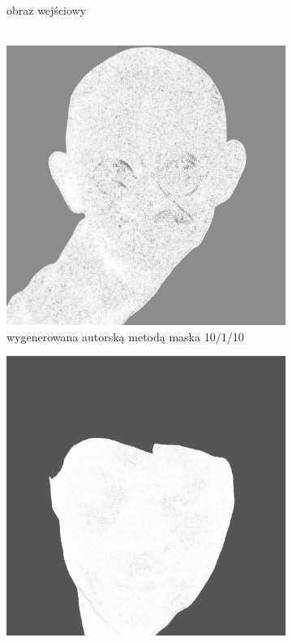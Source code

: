\begin{figure}[H]
\begin{subfigure}{0.24\textwidth}
            \caption{obraz wejściowy\\\hphantom{ }\\\hphantom{ }}
            \label{comp-comp-gandhi-mandela-b}
        \end{subfigure}
        \begin{subfigure}{0.24\textwidth}
            \centering
            \includegraphics[width = \textwidth]{img/6-comp/gandhi_mask_c20_inv0_bg10_obj1_ed10.png}
            \caption{wygenerowana autorską metodą maska 10/1/10}
            \label{comp-comp-gandhi-mandela-c}
        \end{subfigure}
        \begin{subfigure}{0.24\textwidth}
            \centering
            \includegraphics[width = \textwidth]{img/6-comp/mandela_mask_c15_inv0_bg5_obj1_ed1.png}

\end{subfigure}
\end{figure}
